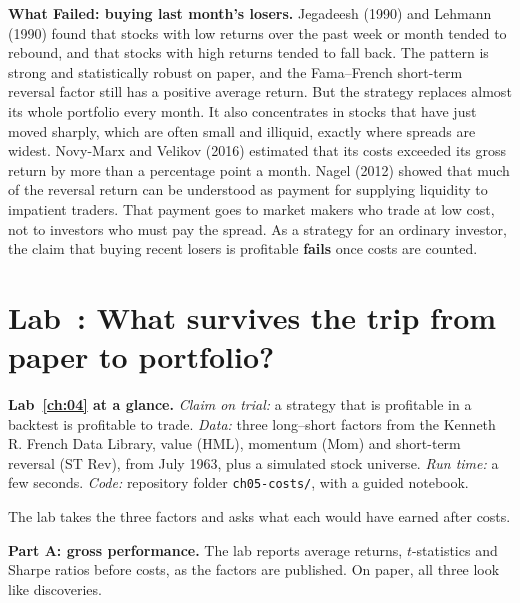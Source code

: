 \begin{callout}
\textbf{What Failed: buying last month's losers.} Jegadeesh (1990) and Lehmann (1990) found that stocks with low returns over the past week or month tended to rebound, and that stocks with high returns tended to fall back. The pattern is strong and statistically robust on paper, and the Fama--French short-term reversal factor still has a positive average return. But the strategy replaces almost its whole portfolio every month. It also concentrates in stocks that have just moved sharply, which are often small and illiquid, exactly where spreads are widest. Novy-Marx and Velikov (2016) estimated that its costs exceeded its gross return by more than a percentage point a month. Nagel (2012) showed that much of the reversal return can be understood as payment for supplying liquidity to impatient traders. That payment goes to market makers who trade at low cost, not to investors who must pay the spread. As a strategy for an ordinary investor, the claim that buying recent losers is profitable \textbf{fails} once costs are counted.
\end{callout}

\section{Lab~\thechapter: What survives the trip from paper to portfolio?}
\label{sec:04-lab}

\begin{callout}
\textbf{Lab~\ref{ch:04} at a glance.} \emph{Claim on trial:} a strategy that is profitable in a backtest is profitable to trade. \emph{Data:} three long--short factors from the Kenneth R. French Data Library, value (HML), momentum (Mom) and short-term reversal (ST Rev), from July 1963, plus a simulated stock universe. \emph{Run time:} a few seconds. \emph{Code:} repository folder \texttt{ch05-costs/}, with a guided notebook.
\end{callout}

The lab takes the three factors and asks what each would have earned after costs.

\textbf{Part A: gross performance.} The lab reports average returns, $t$-statistics and Sharpe ratios before costs, as the factors are published. On paper, all three look like discoveries.

